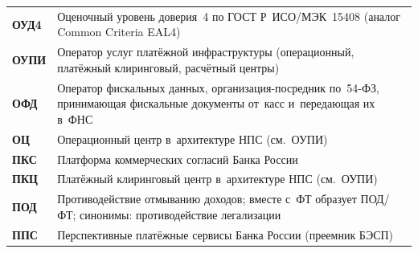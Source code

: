 \begin{longtable}{@{}p{4.5em}p{\dimexpr\linewidth-4.5em-2\tabcolsep\relax}@{}}
  \textbf{ОУД4}              & Оценочный уровень доверия~4 по ГОСТ Р~ИСО/МЭК~15408 (аналог Common Criteria EAL4)                                                                                                                                                                                                                \\
  \textbf{ОУПИ}              & Оператор услуг платёжной инфраструктуры (операционный, платёжный клиринговый, расчётный центры)                                                                                                                                                                                                  \\
  \textbf{ОФД}               & Оператор фискальных данных, организация-посредник по~54-ФЗ, принимающая фискальные документы от~касс и~передающая их в~ФНС                                                                                                                                                                     \\
  \textbf{ОЦ}                & Операционный центр в~архитектуре НПС (см.~ОУПИ)                                                                                                                                                                                                                                                  \\
  \textbf{ПКС}               & Платформа коммерческих согласий Банка России                                                                                                                                                                                                                                                     \\
  \textbf{ПКЦ}               & Платёжный клиринговый центр в~архитектуре НПС (см.~ОУПИ)                                                                                                                                                                                                                                         \\
  \textbf{ПОД}               & Противодействие отмыванию доходов; вместе с~ФТ образует ПОД/ФТ; синонимы: противодействие легализации                                                                                                                                                                                            \\
  \textbf{ППС}               & Перспективные платёжные сервисы Банка России (преемник БЭСП)                                                                                                                                                                                                                                     \\

\end{longtable}
